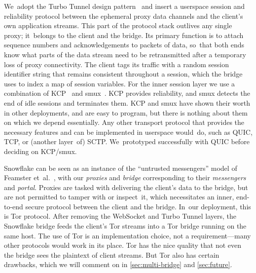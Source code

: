\documentclass[letterpaper,twocolumn]{article}
\newcommand{\firstterm}[1]{\textit{#1}}
\begin{document}
We~adopt the
Turbo Tunnel design pattern~\cite{Fifield2020a}
and insert a userspace
session and reliability protocol
between the ephemeral proxy data channels
and the client's own application streams.
This part of the protocol stack
outlives any single proxy; it~belongs to
the client and the bridge.
Its primary function is to attach sequence numbers and acknowledgements
to packets of data,
so~that both ends know what parts of the data stream
need to be retransmitted after a temporary loss of proxy connectivity.
The client tags its traffic
with a random session identifier string that remains
consistent throughout a session,
which the bridge uses to index a map of session variables.
For the inner session layer we use a combination of
KCP~\cite{kcp} and
smux~\cite{smux}.
KCP provides reliability,
and smux detects the end of idle sessions and terminates them.
KCP and smux have shown their worth in other deployments,
and are easy to program,
but there is nothing about them on which we depend essentially.
Any other transport protocol that provides the necessary features
and can be implemented in userspace would~do,
such as QUIC, TCP, or (another layer~of) SCTP.
We~prototyped successfully with QUIC before deciding on KCP/\allowbreak smux.

%

Snowflake can be seen as an instance of the
``untrusted messengers'' model of Feamster et~al.~\cite[\S 3]{Feamster2003a},
with our \firstterm{proxies} and \firstterm{bridge} corresponding to their
\firstterm{messengers} and \firstterm{portal}.
Proxies are tasked with delivering the client's data to the bridge,
but are not permitted to tamper with or inspect~it,
which necessitates an inner,
end-to-end secure protocol between the client and the bridge.
In~our deployment, this is Tor protocol.
After removing the WebSocket and Turbo Tunnel layers,
the Snowflake bridge feeds the client's Tor streams
into a Tor bridge running on the same host.
The use of Tor is an implementation choice, not a requirement---many
other protocols would work in its place.
Tor has the nice quality that
not even the bridge
sees the plaintext of client streams.
But Tor also has certain drawbacks,
which we will comment on in
\autoref{sec:multi-bridge}
and
\autoref{sec:future}.
\end{document}
